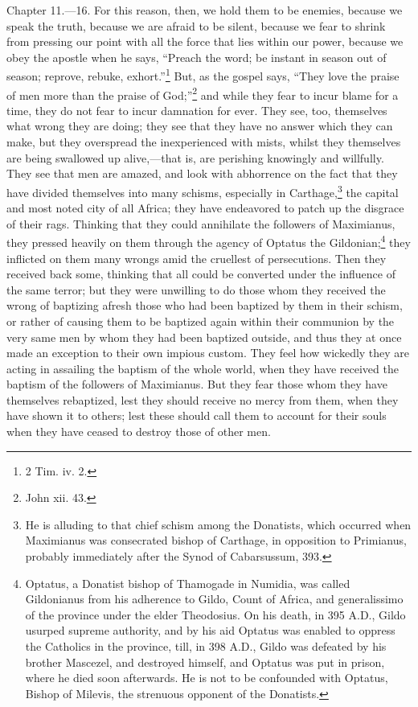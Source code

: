 
Chapter 11.—16. For this reason, then, we hold them to be enemies, because we speak the truth, because we are afraid to be silent, because we fear to shrink from pressing our point with all the force that lies within our power, because we obey the apostle when he says, ``Preach the word; be instant in season out of season; reprove, rebuke, exhort.''\footnote{\par  2 Tim. iv. 2.} But, as the gospel says, ``They love the praise of men more than the praise of God;''\footnote{\par  John xii. 43.} and while they fear to incur blame for a time, they do not fear to incur damnation for ever. They see, too, themselves what wrong they are doing; they see that they have no answer which they can make, but they overspread the inexperienced with mists, whilst they themselves are being swallowed up alive,—that is, are perishing knowingly and willfully. They see that men are amazed, and look with abhorrence on the fact that they have divided themselves into many schisms, especially in Carthage,\footnote{\par  He is alluding to that chief schism among the Donatists, which occurred when Maximianus was consecrated bishop of Carthage, in opposition to Primianus, probably immediately after the Synod of Cabarsussum, 393.} the capital and most noted city of all Africa; they have endeavored to patch up the disgrace of their rags. Thinking that they could annihilate the followers of Maximianus, they pressed heavily on them through the agency of Optatus the Gildonian;\footnote{\par  Optatus, a Donatist bishop of Thamogade in Numidia, was called Gildonianus from his adherence to Gildo, Count of Africa, and generalissimo of the province under the elder Theodosius. On his death, in 395 A.D., Gildo usurped supreme authority, and by his aid Optatus was enabled to oppress the Catholics in the province, till, in 398 A.D., Gildo was defeated by his brother Mascezel, and destroyed himself, and Optatus was put in prison, where he died soon afterwards. He is not to be confounded with Optatus, Bishop of Milevis, the strenuous opponent of the Donatists.} they inflicted on them many wrongs amid the cruellest of persecutions. Then they received back some, thinking that all could be converted under the influence of the same terror; but they were unwilling to do those whom they received the wrong of baptizing afresh those who had been baptized by them in their schism, or rather of causing them to be baptized again within their communion by the very same men by whom they had been baptized outside, and thus they at once made an exception to their own impious custom. They feel how wickedly they are acting in assailing the baptism of the whole world, when they have received the baptism of the followers of Maximianus. But they fear those whom they have themselves rebaptized, lest they should receive no mercy from them, when they have shown it to others; lest these should call them to account for their souls when they have ceased to destroy those of other men.

